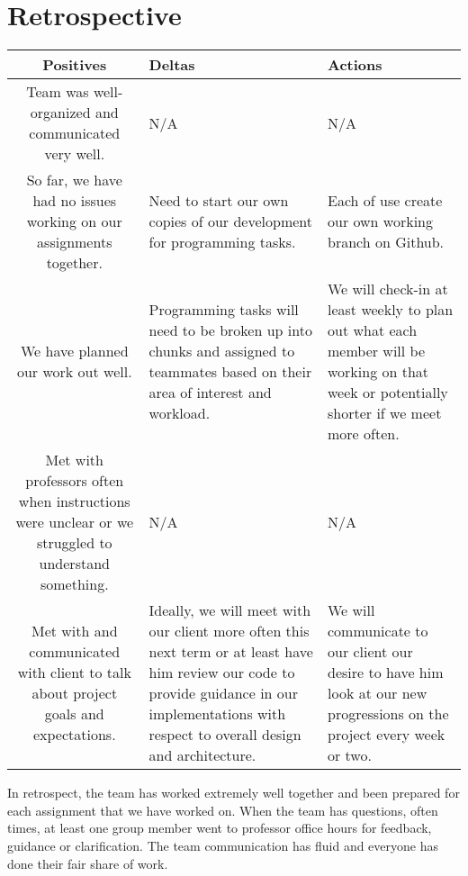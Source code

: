 \documentclass[10pt,letterpaper,onecolumn,draftclsnofoot]{IEEEtran}
\begin{document}
\section{Retrospective}
\begin{center}
	\begin{tabular}{ |C|L|L| } 
		\hline
		Positives & Deltas & Actions \\
		\hline
		Team was well-organized and communicated very well. & N/A & N/A \\ 
		\hline
		So far, we have had no issues working on our assignments together. & Need to start our own copies of our development for programming tasks. & Each of use create our own working branch on Github.\\ 
		\hline
		We have planned our work out well. & Programming tasks will need to be broken up into chunks and assigned to teammates based on their area of interest and workload. & We will check-in at least weekly to plan out what each member will be working on that week or potentially shorter if we meet more often. \\ 
		\hline
		Met with professors often when instructions were unclear or we struggled to understand something. & N/A & N/A \\
		\hline
		Met with and communicated with client to talk about project goals and expectations. & Ideally, we will meet with our client more often this next term or at least have him review our code to provide guidance in our implementations with respect to overall design and architecture. & We will communicate to our client our desire to have him look at our new progressions on the project every week or two.\\
		\hline
	\end{tabular}
\end{center}
In retrospect, the team has worked extremely well together and been prepared for each assignment that we have worked on. When the team has questions, often times, at least one group member went to professor office hours for feedback, guidance or clarification. The team communication has fluid and everyone has done their fair share of work. 
\end{document}
